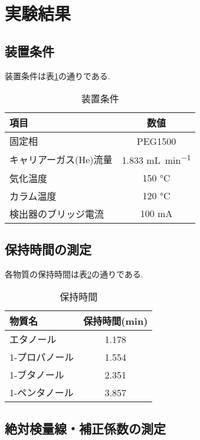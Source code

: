 \section{実験結果}
\subsection{装置条件}
装置条件は表\ref{tab:condition}の通りである.
\begin{table}[h]
  \caption{装置条件}
  \label{tab:condition}
  \centering
  \begin{tabular}{lc}
    \hline
    項目 & 数値 \\
    \hline \hline
    固定相 & PEG1500 \\
    キャリアーガス(He)流量 & 1.833 \si{\milli L.min^{-1}} \\
    気化温度 & 150 \si{\degreeCelsius} \\
    カラム温度 & 120 \si{\degreeCelsius} \\
    検出器のブリッジ電流 & 100 \si{\milli\ampere} \\
    \hline
  \end{tabular}
\end{table}
\subsection{保持時間の測定}
各物質の保持時間は表\ref{tab:time}の通りである.
\begin{table}[h]
   \caption{保持時間}
   \label{tab:time}
   \centering
   \begin{tabular}{lc}
     \hline
     物質名 & 保持時間(\si{min}) \\
     \hline \hline
     エタノール & 1.178 \\
     1-プロパノール & 1.554 \\
     1-ブタノール & 2.351 \\
     1-ペンタノール & 3.857 \\
     \hline
   \end{tabular}
\end{table}
\subsection{絶対検量線・補正係数の測定}
